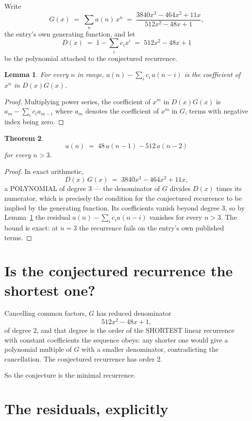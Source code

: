 \documentclass[11pt,a4paper]{article}
\theoremstyle{plain}
\newtheorem{theorem}{Theorem}
\newtheorem{lemma}[theorem]{Lemma}
\theoremstyle{definition}
\begin{document}
Write
\[
G(x)\;=\;\sum_{n}a(n)\,x^{n}\;=\;\frac{3840 x^{3} - 464 x^{2} + 11 x}{512 x^{2} - 48 x + 1},
\]
the entry's own generating function, and let
\[
D(x)\;=\;1-\sum_i c_i x^{i}\;=\;512 x^{2} - 48 x + 1
\]
be the polynomial attached to the conjectured recurrence.

\begin{lemma}\label{lem:key}
For every $n$ in range, $a(n)-\sum_i c_i\,a(n-i)$ is the coefficient of $x^{n}$ in
$D(x)G(x)$.
\end{lemma}

\begin{proof}
Multiplying power series, the coefficient of $x^{m}$ in $D(x)G(x)$ is
$a_m-\sum_i c_i a_{m-i}$ where $a_m$ denotes the coefficient of $x^{m}$ in $G$, terms with
negative index being zero.
\end{proof}

\begin{theorem}
\[
a(n)\;=\;48\,a(n-1) - 512\,a(n-2)
\]
for every $n>3$.
\end{theorem}

\begin{proof}
In exact arithmetic,
\[
D(x)\,G(x)\;=\;3840 x^{3} - 464 x^{2} + 11 x,
\]
a POLYNOMIAL of degree $3$ --- the denominator of $G$ divides $D(x)$ times its numerator,
which is precisely the condition for the conjectured recurrence to be implied by the
generating function. Its coefficients vanish beyond degree $3$, so by
Lemma~\ref{lem:key} the residual $a(n)-\sum_ic_ia(n-i)$ vanishes for every
$n>3$. The bound is exact: at $n=3$ the recurrence fails on the entry's own published terms.
\end{proof}

\section{Is the conjectured recurrence the shortest one?}

Cancelling common factors, $G$ has reduced denominator
\[
512 x^{2} - 48 x + 1,
\]
of degree $2$, and that degree is the order of the SHORTEST linear recurrence with
constant coefficients the sequence obeys: any shorter one would give a polynomial multiple of
$G$ with a smaller denominator, contradicting the cancellation. The conjectured recurrence has
order $2$.

So the conjecture is the minimal recurrence.

\section{The residuals, explicitly}
\end{document}
